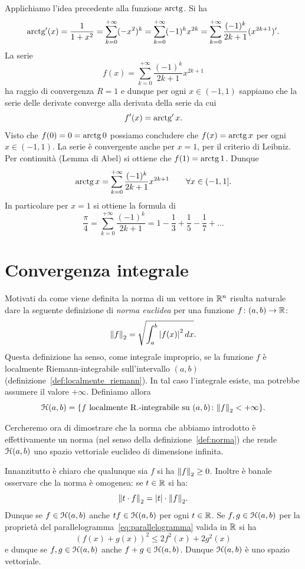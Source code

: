 \begin{example}
Applichiamo l'idea precedente alla funzione $\operatorname{arctg}$. Si ha
\[
  \operatorname{arctg}'(x) = \frac{1}{1+x^2} = \sum_{k=0}^{+\infty} (-x^2)^k
  = \sum_{k=0}^{+\infty} (-1)^k x^{2k}
  = \sum_{k=0}^{+\infty} \frac{(-1)^k}{2k+1}(x^{2k+1})'.
\]
La serie
\[
 f(x) = \sum_{k=0}^{+\infty}\frac{(-1)^k}{2k+1} x^{2k+1}
\]
ha raggio di convergenza $R=1$ e dunque per ogni $x\in(-1,1)$ sappiamo che la serie delle derivate converge alla derivata della serie da cui
\[
  f'(x) = \operatorname{arctg}' x.
\]
Visto che $f(0) = 0 = \operatorname{arctg} 0$ possiamo concludere che $f(x) =\operatorname{arctg} x$ per ogni $x\in (-1,1)$.
La serie è convergente anche per $x=1$, per il criterio di Leibniz. Per continuità (Lemma di Abel) si ottiene che $f(1) = \operatorname{arctg} 1$.
Dunque
\[
  \operatorname{arctg} x = \sum_{k=0}^{+\infty}\frac{(-1)^k}{2k+1}x^{2k+1}
  \qquad \forall x \in (-1,1].
\]
In particolare per $x=1$ si ottiene la formula di 
\[
  \frac{\pi}{4} = \sum_{k=0}^{+\infty} \frac{(-1)^k}{2k+1} =
   1 - \frac{1}{3} + \frac{1}{5} - \frac{1}{7} + \dots
\]
\end{example}

\section{Convergenza integrale}

Motivati da come viene definita la norma di un vettore
in $\mathbb R^n$ risulta naturale
dare la seguente definizione di
\emph{norma euclidea} per una funzione $f\colon (a,b)\to \mathbb R$:
\[
  {\left\Vert f\right\Vert}_2 = \sqrt{\int_a^b {\left|f(x)\right|}^2\, dx}.
\]
Questa definizione ha senso, come integrale improprio, se la funzione $f$
è localmente Riemann-integrabile sull'intervallo $(a,b)$
(definizione~\ref{def:localmente_riemann}).
In tal
caso l'integrale esiste, ma potrebbe assumere il valore $+\infty$. Definiamo
allora
\[
\mathcal H(a,b) =
{\left\{ \text{$f$ localmente R.-integrabile su $(a,b)$}\colon {\left\Vert  f\right\Vert}_2< +\infty \right\}}.
\]

Cercheremo ora di dimostrare che la norma che abbiamo introdotto
è effettivamente un norma (nel senso della definizione~\ref{def:norma})
che rende $\mathcal H(a,b)$ uno spazio vettoriale euclideo di dimensione infinita.

Innanzitutto è chiaro che qualunque sia $f$ si ha
${\left\Vert  f\right\Vert}_2\ge 0$.
Inoltre è banale osservare che la norma è omogenea: se $t\in \mathbb R$ si ha:
\[
  {\left\Vert t\cdot f\right\Vert}_2= {\left|t\right|}\cdot {\left\Vert f\right\Vert}_2.
\]
Dunque se $f\in \mathcal H(a,b)$ anche $t f\in \mathcal H(a,b)$ per ogni $t \in \mathbb R$.
Se $f,g\in \mathcal H(a,b)$ per la proprietà del parallelogramma~\eqref{eq:parallelogramma}
valida in $\mathbb R$ si ha
\[
  (f(x) + g(x))^2 \le 2f^2(x) + 2 g^2(x)
\]
e dunque se $f,g \in \mathcal H(a,b)$ anche $f+g\in \mathcal H(a,b)$.
Dunque $\mathcal H(a,b)$ è uno spazio vettoriale.

